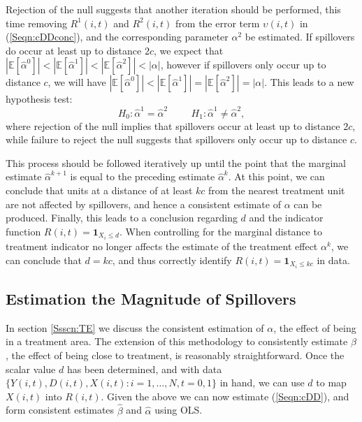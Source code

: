 \documentclass{article}
\begin{document}
\begin{spacing}{1.3}
Rejection of the null suggests that another iteration should be performed, this time
removing $R^1(i,t)$ and $R^2(i,t)$ from the error term $\upsilon(i,t)$ in 
(\ref{Seqn:cDDconc}), and the corresponding 
parameter $\alpha^2$ be estimated.  If spillovers do occur at least up to distance 
$2c$, we expect that $|\mathbb{E}[\hat\alpha^0]|<|\mathbb{E}[\hat\alpha^1]|<
|\mathbb{E}[\hat\alpha^2]|<|\alpha|$, however if spillovers only occur up to distance
$c$, we will have $|\mathbb{E}[\hat\alpha^0]|<|\mathbb{E}[\hat\alpha^1]|=
|\mathbb{E}[\hat\alpha^2]|=|\alpha|$.  This leads to a new hypothesis test:
\[
H_0: \hat\alpha^1=\hat\alpha^2 \hspace{1cm}
H_1: \hat\alpha^1\neq\hat\alpha^2,
\]
where rejection of the null implies that spillovers occur at least up to distance
$2c$, while failure to reject the null suggests that spillovers only occur up to 
distance $c$.

This process should be followed iteratively up until the point that the marginal 
estimate $\hat\alpha^{k+1}$ is equal to the preceding estimate $\hat\alpha^{k}$.  At
this point, we can conclude that units at a distance of at least $kc$ from the 
nearest treatment unit are not affected by spillovers, and hence a consistent 
estimate of $\alpha$ can be produced.  Finally, this leads to a conclusion regarding
$d$ and the indicator function $R(i,t)=\mathbf{1}_{X_i\leq d}$.  When controlling
for the marginal distance to treatment indicator no longer affects the estimate of 
the treatment effect $\alpha^k$, we can conclude that $d=kc$, and thus correctly 
identify $R(i,t)=\mathbf{1}_{X_i\leq kc}$ in data.


\subsection{Estimation the Magnitude of Spillovers}
\label{Ssscn:SE}
In section \ref{Ssscn:TE} we discuss the consistent estimation of $\alpha$, the
effect of being in a treatment area.  The extension of this methodology to 
consistently estimate $\beta$, the effect of being close to treatment, is 
reasonably straightforward.  Once the scalar value $d$ has been determined, and
with data $\{Y(i,t), D(i,t), X(i,t): i=1, \ldots, N, t=0, 1\}$ in hand, we can 
use $d$ to map $X(i,t)$ into $R(i,t)$. Given the above we can now estimate 
(\ref{Seqn:cDD}), and form consistent estimates $\hat\beta$ and $\hat\alpha$ using 
OLS.


\end{spacing}
\end{document}
